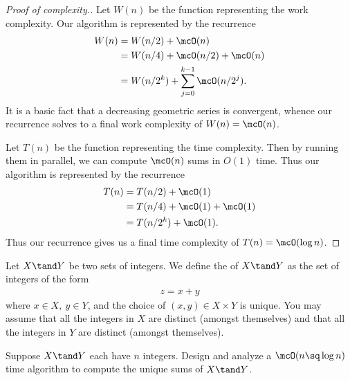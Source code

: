 \documentclass[10pt]{article}
\begin{document}
\begin{proof}[Proof of complexity.]
  Let \( W(n) \) be the function representing the work complexity.
  Our algorithm is represented by the recurrence \begin{align*}
    W(n) &= W(n/2) + \mcO(n) \\
         &= W(n/4) + \mcO(n/2) + \mcO(n) \\
         &= W(n/2^k) + \sum_{j=0}^{k-1} \mcO(n/2^j).
  \end{align*}
  It is a basic fact that a decreasing geometric series is convergent, whence our recurrence solves to a final work complexity of \( W(n) = \mcO(n) \).

  Let \( T(n) \) be the function representing the time complexity. Then by running them in parallel, we can compute \( \mcO(n) \) sums in \( O(1) \) time. Thus our algorithm is represented by the recurrence \begin{align*}
    T(n) &= T(n/2) + \mcO(1) \\
         &= T(n/4) + \mcO(1) + \mcO(1) \\
         &= T(n/2^k) + \mcO(1).
  \end{align*}
  Thus our recurrence gives us a final time complexity of \( T(n) = \mcO(\log n) \).
\end{proof}

\pagebreak
\setcounter{section}{4}
\setcounter{exercise}{2}
Let \( X \tand Y \) be two sets of integers. We define the  of \( X \tand Y \) as the set of integers of the form \begin{align*}
  z = x+y
\end{align*} where \( x\in X,\ y\in Y \), and the choice of \( (x,y) \in X\times Y \) is unique. You may assume that all the integers in \( X \) are distinct (amongst themselves) and that all the integers in \( Y \) are distinct (amongst themselves).

\begin{subexercise}
  Suppose \( X\tand Y \) each have \( n \) integers. Design and analyze a \( \mcO(n\sq \log n) \) time algorithm to compute the unique sums of \( X\tand Y \).
\end{subexercise}
\end{document}
